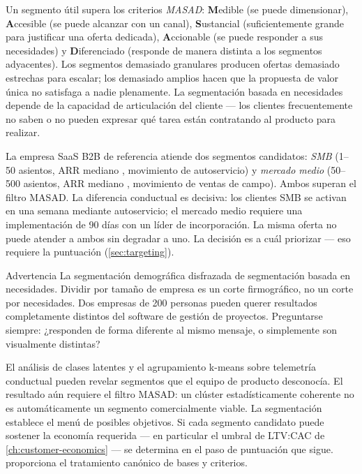 Un segmento útil supera los criterios \emph{MASAD}: \textbf{M}edible (se puede dimensionar), \textbf{A}ccesible (se puede alcanzar con un canal), \textbf{S}ustancial (suficientemente grande para justificar una oferta dedicada), \textbf{A}ccionable (se puede responder a sus necesidades) y \textbf{D}iferenciado (responde de manera distinta a los segmentos adyacentes). Los segmentos demasiado granulares producen ofertas demasiado estrechas para escalar; los demasiado amplios hacen que la propuesta de valor única no satisfaga a nadie plenamente. La segmentación basada en necesidades depende de la capacidad de articulación del cliente --- los clientes frecuentemente no saben o no pueden expresar qué tarea están contratando al producto para realizar.

\begin{example}
La empresa SaaS B2B de referencia atiende dos segmentos candidatos: \emph{SMB} (1--50 asientos, ARR mediano , movimiento de autoservicio) y \emph{mercado medio} (50--500 asientos, ARR mediano , movimiento de ventas de campo). Ambos superan el filtro MASAD. La diferencia conductual es decisiva: los clientes SMB se activan en una semana mediante autoservicio; el mercado medio requiere una implementación de 90 días con un líder de incorporación. La misma oferta no puede atender a ambos sin degradar a uno. La decisión es a cuál priorizar --- eso requiere la puntuación (\cref{sec:targeting}).
\end{example}

\begin{admonition}{Advertencia}
La segmentación demográfica disfrazada de segmentación basada en necesidades. Dividir por tamaño de empresa es un corte firmográfico, no un corte por necesidades. Dos empresas de 200 personas pueden querer resultados completamente distintos del software de gestión de proyectos. Preguntarse siempre: ¿responden de forma diferente al mismo mensaje, o simplemente son visualmente distintas?
\end{admonition}

El análisis de clases latentes y el agrupamiento k-means sobre telemetría conductual pueden revelar segmentos que el equipo de producto desconocía. El resultado aún requiere el filtro MASAD: un clúster estadísticamente coherente no es automáticamente un segmento comercialmente viable. La segmentación establece el menú de posibles objetivos. Si cada segmento candidato puede sostener la economía requerida --- en particular el umbral de LTV:CAC de \cref{ch:customer-economics} --- se determina en el paso de puntuación que sigue. \textcite{kotler2021} proporciona el tratamiento canónico de bases y criterios.

